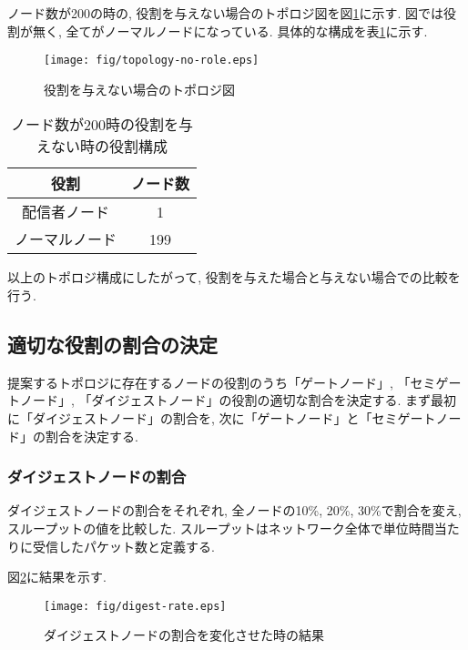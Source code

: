 ノード数が200の時の, 役割を与えない場合のトポロジ図を図\ref{fig:topology-no-role}に示す. 図では役割が無く, 全てがノーマルノードになっている. 具体的な構成を表\ref{tbl:topology-ex-no-role}に示す.

\newpage

\begin{figure}[h]
  \centering
  \texttt{[image: fig/topology-no-role.eps]}
  \caption{役割を与えない場合のトポロジ図}
  \label{fig:topology-no-role}
\end{figure}

\begin{table}[h]
  \caption{ノード数が200時の役割を与えない時の役割構成}
  \label{tbl:topology-ex-no-role}
  \centering
      {\small
        \begin{tabular}{|c|c|} \hline
        役割 & ノード数 \\ \hline \hline
        配信者ノード & 1 \\ \hline
        ノーマルノード & 199 \\ \hline
        \end{tabular}
      }
\end{table}

以上のトポロジ構成にしたがって, 役割を与えた場合と与えない場合での比較を行う.

\newpage

\subsection{適切な役割の割合の決定}
提案するトポロジに存在するノードの役割のうち「ゲートノード」, 「セミゲートノード」, 「ダイジェストノード」の役割の適切な割合を決定する. まず最初に「ダイジェストノード」の割合を, 次に「ゲートノード」と「セミゲートノード」の割合を決定する.

\subsubsection{ダイジェストノードの割合}
ダイジェストノードの割合をそれぞれ, 全ノードの10\%, 20\%, 30\%で割合を変え, スループットの値を比較した. スループットはネットワーク全体で単位時間当たりに受信したパケット数と定義する.

図\ref{fig:digest-rate}に結果を示す.

\begin{figure}[h]
  \centering
  \texttt{[image: fig/digest-rate.eps]}
  \caption{ダイジェストノードの割合を変化させた時の結果}
  \label{fig:digest-rate}
\end{figure}

